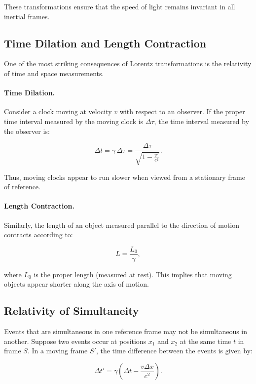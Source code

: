 \documentclass[12pt,a4paper]{article}
\begin{document}
These transformations ensure that the speed of light remains invariant
in all inertial frames.

\subsection{Time Dilation and Length Contraction}

One of the most striking consequences of Lorentz transformations is
the relativity of time and space measurements.

\paragraph{Time Dilation.}
Consider a clock moving at velocity $v$ with respect to an observer.
If the proper time interval measured by the moving clock is $\Delta \tau$,
the time interval measured by the observer is:

\begin{equation}
  \Delta t = \gamma \, \Delta \tau =
  \frac{\Delta \tau}{\sqrt{1 - \frac{v^2}{c^2}}}.
\end{equation}

Thus, moving clocks appear to run slower when viewed from a stationary
frame of reference.

\paragraph{Length Contraction.}
Similarly, the length of an object measured parallel to the direction
of motion contracts according to:

\begin{equation}
  L = \frac{L_0}{\gamma},
\end{equation}

where $L_0$ is the proper length (measured at rest).
This implies that moving objects appear shorter along the axis of motion.

\subsection{Relativity of Simultaneity}

Events that are simultaneous in one reference frame may not be simultaneous
in another. Suppose two events occur at positions $x_1$ and $x_2$ at the same
time $t$ in frame $S$. In a moving frame $S'$, the time difference between
the events is given by:

\begin{equation}
  \Delta t' = \gamma \left( \Delta t - \frac{v \Delta x}{c^2} \right).
\end{equation}
\end{document}
